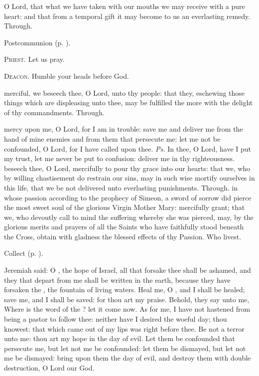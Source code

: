 
\postcommunion
{} O Lord, that what we have taken with our mouths we may receive with a pure heart: and that from a temporal gift it may become to us an everlasting remedy. Through.
\begin{rubric}
     Postcommunion  (p. \pageref{AshWednesdayMassPostcommunion}).
\end{rubric}

\textsc{Priest.} Let us pray.\par
\textsc{Deacon.} Humble your heads before God.\par
{} merciful, we beseech thee, O Lord, unto thy people: that they, eschewing those things which are displeasing unto thee, may be fulfilled the more with the delight of thy commandments. Through.


\clearpage
{}
\introit
{} mercy upon me, O Lord, for I am in trouble: save me and deliver me from the hand of mine enemies and from them that persecute me: let me not be confounded, O Lord, for I have called upon thee. \textit{Ps.} In thee, O Lord, have I put my trust, let me never be put to confusion: deliver me in thy righteousness.
\collect
{} beseech thee, O Lord, mercifully to pour thy grace into our hearts: that we, who by willing chastisement do restrain our sins, may in such wise mortify ourselves in this life, that we be not delivered unto everlasting punishments. Through.
 in whose passion according to the prophecy of Simeon, a sword of sorrow did pierce the most sweet soul of the glorious Virgin Mother Mary: mercifully grant; that we, who devoutly call to mind the suffering whereby she was pierced, may, by the glorious merits and prayers of all the Saints who have faithfully stood beneath the Cross, obtain with 	gladness the blessed effects of thy Passion. Who livest.
\begin{rubric}
     Collect  (p. \pageref{AshWednesdayMassCollect}).
\end{rubric}

 Jeremiah said: O , the hope of Israel, all that forsake thee shall be ashamed, and they that depart from me shall be written in the earth, because they have forsaken the , the fountain of living waters. Heal me, O , and I shall be healed; save me, and I shall be saved: for thou art my praise. Behold, they say unto me, Where is the word of the ? let it come now. As for me, I have not hastened from being a pastor to follow thee: neither have I desired the woeful day; thou knowest: that which came out of my lips was right before thee. Be not a terror unto me: thou art my hope in the day of evil. Let them be confounded that persecute me, but let not me be confounded: let them be dismayed, but let not me be dismayed: bring upon them the day of evil, and destroy them with double destruction, O Lord our God.

